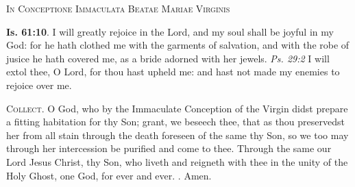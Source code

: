 \documentclass[11pt]{article} %
\begin{document}
\begin{center}\begin{huge}
  \textsc{In Conceptione Immaculata Beatae Mariae Virginis}
\end{huge}\end{center}

\def\greinitialformat#1{%
  {\fontsize{34}{34}\selectfont #1}%
}

\textbf{Is. 61:10}. I will greatly rejoice in the Lord, and my soul shall be
joyful in my God: for he hath clothed me with the garments of salvation, and
with the robe of jusice he hath covered me, as a bride adorned with her jewels.
\emph{Ps. 29:2} I will extol thee, O Lord, for thou hast upheld me: and hast not
made my enemies to rejoice over me.



\vskip10pt

\textsc{Collect}. O God, who by the Immaculate Conception of the Virgin didst
prepare a fitting habitation for thy Son; grant, we beseech thee, that as thou
preservedst her from all stain through the death foreseen of the same thy Son,
so we too may through her intercession be purified and come to thee.
Through the same our Lord Jesus Christ, thy Son, who liveth and reigneth with
thee in the unity of the Holy Ghost, one God, for ever and ever. \Rbar{}. Amen.


\vskip10pt
  
\end{document}
